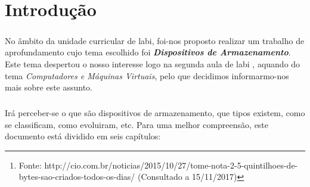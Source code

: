 \documentclass[a4paper]{report}
\begin{document}
\begin{abstract}

Nesta era digital, será que alguém já parou para pensar quantos bytes de informação o mundo armazena, partilha e processa diariamente? 

Ações simples como entrar na conta de e-mail, ler notícias online, fazer chamadas e mandar mensagens já são tão naturais no nosso dia-a-dia que normalmente não há nenhuma reflexão sobre o universo que há por trás dessas tarefas tão simples e banais.

São mais de 2 500 000 000 000 000 000 bytes\footnote{Fonte: http://cio.com.br/noticias/2015/10/27/tome-nota-2-5-quintilhoes-de-bytes-sao-criados-todos-os-dias/ (Consultado a 15/11/2017)}... O correspondente a 2 500 000 terabytes!

Por essa razão, uma das necessidades fundamentais é a criação de dispositivos que permitam armazenar cada vez mais informação, possibilitando o acesso de forma rápida e segura, pois a velocidade e a fiabilidade também são dois dos requisitos principais necessários nestes dispositivos.

É nestes aspetos que este nosso trabalho vai incidir! Vamos dar a conhecer alguns dos muitos dispositivos utilizados para o armazenamento destes dados, indicando as suas caraterísticas, vantagens e desvantagens.

\end{abstract}

\tableofcontents
\listoffigures    

\clearpage
{}

\chapter{Introdução}
\label{chap.introducao}

\paragraph*{}No âmbito da unidade curricular de \ac{labi}, foi-nos proposto realizar um trabalho de aprofundamento cujo tema escolhido foi \textit{\textbf{Dispositivos de Armazenamento}}. Este tema despertou o nosso interesse logo na segunda aula de \ac{labi} , aquando do tema \textit{Computadores e Máquinas Virtuais}, pelo que decidimos informarmo-nos mais sobre este assunto.

\paragraph*{}Irá perceber-se o que são dispositivos de armazenamento, que tipos existem, como se classificam, como evoluiram, etc. Para uma melhor compreensão, este documento está dividido em seis capítulos:
\end{document}
